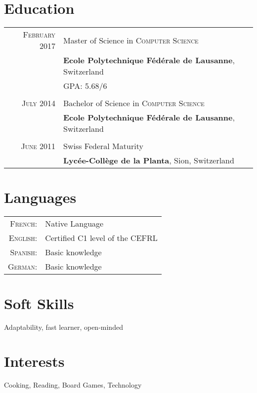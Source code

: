 \documentclass[a4paper,10pt]{article}
\begin{document}
\section{Education}
\begin{tabular}{rl}	
	\textsc{February 2017} & Master of Science in \textsc{Computer Science} \\
	& \textbf{Ecole Polytechnique Fédérale de Lausanne}, Switzerland\\
	&\normalsize \textsc{GPA}: 5.68/6\\\\
	\textsc{July} 2014 & Bachelor of Science in \textsc{Computer Science}\\
	& \textbf{Ecole Polytechnique Fédérale de Lausanne}, Switzerland\\\\
	\textsc{June 2011} & Swiss Federal Maturity\\
	&\textbf{Lycée-Collège de la Planta}, Sion, Switzerland
\end{tabular}

\section{Languages}
\begin{tabular}{rl}
	\textsc{French:}&Native Language\\
	\textsc{English:}&Certified C1 level of the CEFRL\\
	\textsc{Spanish:}&Basic knowledge\\
	\textsc{German:}&Basic knowledge
\end{tabular}

\section{Soft Skills}
Adaptability, fast learner, open-minded

\section{Interests}
Cooking, Reading, Board Games, Technology
\end{document}
